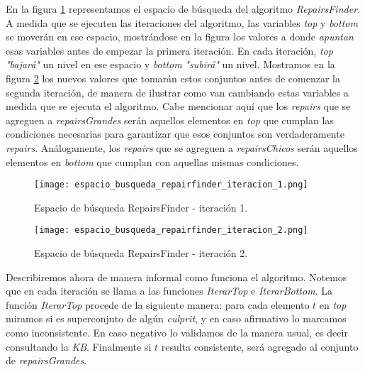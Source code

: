 \documentclass[11pt,a4paper,twoside]{tesis}
\begin{document}
En la figura \ref{fig:espacio_busqueda_repair_finder_1} representamos el espacio de búsqueda del algoritmo \textit{RepairsFinder}.  A medida que se ejecuten las iteraciones del algoritmo, las variables \textit{top} y \textit{bottom} se moverán en ese espacio, mostrándose en la figura los valores a donde \textit{apuntan} esas variables antes de empezar la primera iteración. En cada iteración, \textit{top} \textit{"bajará"} un nivel en ese espacio y \textit{bottom} \textit{"subirá"} un nivel. Mostramos en la figura \ref{fig:espacio_busqueda_repair_finder_2} los nuevos valores que tomarán estos conjuntos antes de comenzar la segunda iteración, de manera de ilustrar como van cambiando estas variables a medida que se ejecuta el algoritmo. Cabe mencionar aquí que los \textit{repairs} que se agreguen a \textit{repairsGrandes} serán aquellos elementos en \textit{top} que cumplan las condiciones necesarias para garantizar que esos conjuntos son verdaderamente \textit{repairs}. Análogamente, los \textit{repairs} que se agreguen a \textit{repairsChicos} serán aquellos elementos en \textit{bottom} que cumplan con aquellas mismas condiciones.

\begin{figure}[ht]
    \texttt{[image: espacio\_busqueda\_repairfinder\_iteracion\_1.png]}
    \centering
    \caption{Espacio de búsqueda RepairsFinder - iteración 1.}
    \label{fig:espacio_busqueda_repair_finder_1}
\end{figure}

\begin{figure}[ht]
    \texttt{[image: espacio\_busqueda\_repairfinder\_iteracion\_2.png]}
    \centering
    \caption{Espacio de búsqueda RepairsFinder - iteración 2.}
    \label{fig:espacio_busqueda_repair_finder_2}
\end{figure}

Describiremos ahora de manera informal como funciona el algoritmo. Notemos que en cada iteración se llama a las funciones \textit{IterarTop} e \textit{IterarBottom}. La función \textit{IterarTop} procede de la siguiente manera: para cada elemento $t$ en \textit{top} miramos si es superconjuto de algún \textit{culprit}, y en caso afirmativo lo marcamos como inconsistente. En caso negativo lo validamos de la manera usual, es decir consultando la \textit{KB}. Finalmente si $t$ resulta consistente, será agregado al conjunto de \textit{repairsGrandes}. 
\end{document}
